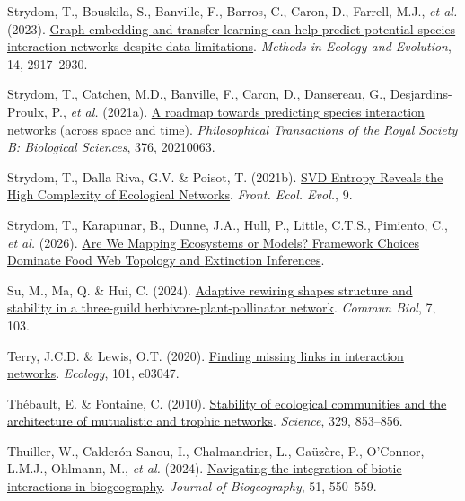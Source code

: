 \documentclass[
]{article}
\newlength{\cslhangindent}
\newenvironment{CSLReferences}[2] %
 {\begin{list}{}{%
  \setlength{\itemindent}{0pt}
  \setlength{\leftmargin}{0pt}
  \setlength{\parsep}{0pt}
  \ifodd #1
   \setlength{\leftmargin}{\cslhangindent}
   \setlength{\itemindent}{-1\cslhangindent}
  \fi
  \setlength{\itemsep}{#2\baselineskip}}}
 {\end{list}}
\begin{document}
\begin{CSLReferences}{1}{0}
Strydom, T., Bouskila, S., Banville, F., Barros, C., Caron, D., Farrell,
M.J., \emph{et al.} (2023).
\href{https://doi.org/10.1111/2041-210X.14228}{Graph embedding and
transfer learning can help predict potential species interaction
networks despite data limitations}. \emph{Methods in Ecology and
Evolution}, 14, 2917--2930.

Strydom, T., Catchen, M.D., Banville, F., Caron, D., Dansereau, G.,
Desjardins-Proulx, P., \emph{et al.} (2021a).
\href{https://doi.org/10.1098/rstb.2021.0063}{A roadmap towards
predicting species interaction networks (across space and time)}.
\emph{Philosophical Transactions of the Royal Society B: Biological
Sciences}, 376, 20210063.

Strydom, T., Dalla Riva, G.V. \& Poisot, T. (2021b).
\href{https://doi.org/10.3389/fevo.2021.623141}{{SVD Entropy Reveals}
the {High Complexity} of {Ecological Networks}}. \emph{Front. Ecol.
Evol.}, 9.

Strydom, T., Karapunar, B., Dunne, J.A., Hull, P., Little, C.T.S.,
Pimiento, C., \emph{et al.} (2026).
\href{https://ecoevorxiv.org/repository/view/13495/}{Are {We Mapping
Ecosystems} or {Models}? {Framework Choices Dominate Food Web Topology}
and {Extinction Inferences}}.

Su, M., Ma, Q. \& Hui, C. (2024).
\href{https://doi.org/10.1038/s42003-024-05784-8}{Adaptive rewiring
shapes structure and stability in a three-guild
herbivore-plant-pollinator network}. \emph{Commun Biol}, 7, 103.

Terry, J.C.D. \& Lewis, O.T. (2020).
\href{https://doi.org/10.1002/ecy.3047}{Finding missing links in
interaction networks}. \emph{Ecology}, 101, e03047.

Thébault, E. \& Fontaine, C. (2010).
\href{https://doi.org/10.1126/science.1188321}{Stability of ecological
communities and the architecture of mutualistic and trophic networks}.
\emph{Science}, 329, 853--856.

Thuiller, W., Calderón-Sanou, I., Chalmandrier, L., Gaüzère, P.,
O'Connor, L.M.J., Ohlmann, M., \emph{et al.} (2024).
\href{https://doi.org/10.1111/jbi.14734}{Navigating the integration of
biotic interactions in biogeography}. \emph{Journal of Biogeography},
51, 550--559.


\end{CSLReferences}
\end{document}
